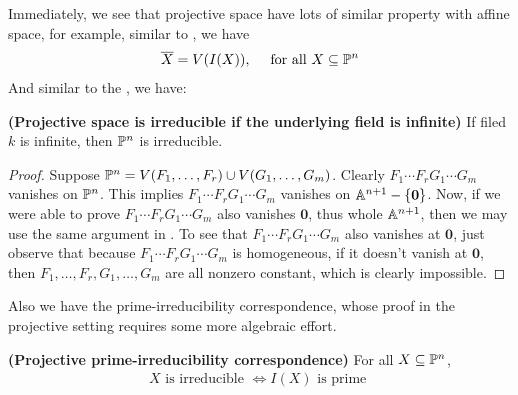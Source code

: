 \documentclass{report}
\begin{document}
Immediately, we see that projective space have lots of similar property with affine space, for example, similar to  , we have 
\begin{align*}
\overline{X}=V(I(X)),\quad \text{ for all }X\subseteq \P^n
\end{align*}
And similar to the , we have:
\begin{theorem}
\label{Psii}
\textbf{(Projective space is irreducible if the underlying field is infinite)} If filed $k$ is infinite, then $\P^n$ is irreducible. 
\end{theorem}
\begin{proof}
  Suppose $\P^n=V(F_1,\dots ,F_r)\cup  V(G_1,\dots, G_m)$. Clearly $F_1\cdots F_rG_1\cdots G_m$ vanishes on $\P^n$. This implies  $F_1\cdots F_rG_1\cdots G_m$ vanishes on $\A^{n+1}- \set{\textbf{0}}$. Now, if we were able to prove $F_1\cdots F_rG_1\cdots G_m$ also vanishes  $\textbf{0}$, thus whole $\A^{n+1}$, then we may use the same argument in . To see that $F_1\cdots F_rG_1\cdots G_m$ also vanishes at $\textbf{0}$, just observe that because $F_1\cdots F_rG_1\cdots G_m$ is homogeneous, if it doesn't vanish at $\textbf{0}$, then $F_1,\dots ,F_r,G_1,\dots ,G_m$ are all nonzero constant, which is clearly impossible.
\end{proof}
Also we have the prime-irreducibility correspondence, whose proof in the projective setting requires some more algebraic effort. 
\begin{theorem}
\label{Ppic}
\textbf{(Projective prime-irreducibility correspondence)} For all $X\subseteq \P^n$, 
\begin{align*}
X\text{ is irreducible }\iff I(X)\text{ is prime }
\end{align*}
\end{theorem}
\end{document}

